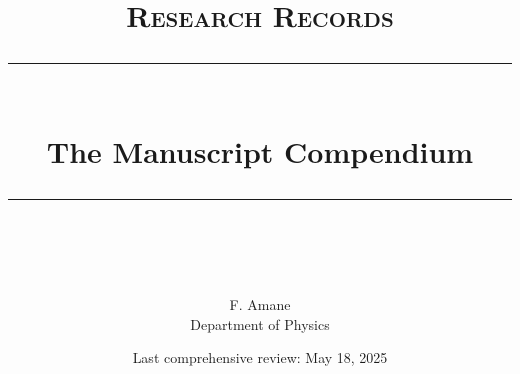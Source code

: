 \usepackage{natbib} 
\usetikzlibrary{cd}
\usepackage{hyperref} %
\makeindex
\let\oldindex\index
\renewcommand{\index}[1]{\oldindex{#1}\marginpar{\hspace{3mm}\small#1}}

\let\oldtextit\textit 
\renewcommand\textit[1]{\oldtextit{\color{orange!70!black}#1}}
\setlength{\parskip}{3pt}
\let\MakeUppercase\relax
\fancyhfinit{\sffamily\bfseries}
\newcommand{\HRule}[1]{\rule{\linewidth}{#1}} 	%

\makeatletter							%
\def\printtitle{%
    {\centering \@title\par}}
\makeatother									

\makeatletter							%
\def\printauthor{%
    {\centering \large \@author}}				
\makeatother

\title{	\normalsize \textsc{Research Records} 	%
		 	\\[3.0cm]								%
			\HRule{0.5pt} \\						%
			\huge {\sffamily The Manuscript Compendium}%
      
			\HRule{1pt} \\ [2.5cm]		%
			\normalsize	\normalfont 		%
		}
\author{
		F. Amane\\ Department of Physics
}
\date{Last comprehensive review: May 18, 2025}
\checkandfixthelayout 

